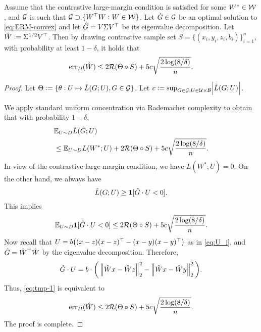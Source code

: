 \begin{theorem}\label{thm:main}
Assume that the contrastive large-margin condition is satisfied for some $W^* \in \mathcal{W}$, and $\mathcal{G}$ is such that $\mathcal{G} \supset \{ W^{\top} W: W \in \mathcal{W}\}$. Let $\hat{G} \in \mathcal{G}$ be an optimal solution to \eqref{eq:ERM-convex} and let $\hat{G} = V \Sigma V^{\top}$ be its eigenvalue decomposition. Let $\hat{W} := \Sigma^{1/2} V^{\top}$. Then by drawing contrastive sample set $S = \{(x_i, y_i, z_i, b_i)\}_{i=1}^n$, with probability at least $1-\delta$, it holds that 
\begin{equation*}
\mathrm{err}_D(\hat{W}) \leq 2 \mathcal{R}(\Theta \circ S) + 5c \sqrt{\frac{2 \log(8/\delta)}{n}}.
\end{equation*}
\end{theorem}
\begin{proof}
Let $\Theta := \{\theta: U \mapsto \tilde{L}(G; U), G \in \mathcal{G}\}$. Let $c := \sup_{G \in \mathcal{G}, U \in \mathcal{U} \times \mathcal{B}} \abs{ \tilde{L}(G; U)}$.

We apply standard uniform concentration via Rademacher complexity \citep{bartlett2002rademacher} to obtain that with probability $1-\delta$,
\begin{align*}
&\mathbb{E}_{U \sim D} \tilde{L}(\hat{G}; U) \\
&\leq \mathbb{E}_{U \sim D} L(W^*; U) + 2 \mathcal{R}(\Theta \circ S) + 5c \sqrt{\frac{2 \log(8/\delta)}{n}}.
\end{align*}
In view of the contrastive large-margin condition, we have $L(W^*; U) = 0$. On the other hand, we always have
\begin{equation*}
\tilde{L}(G; U) \geq \mathbf{1}[\hat{G} \cdot U < 0].
\end{equation*}
This implies
\begin{equation}\label{eq:tmp-1}
\mathbb{E}_{U \sim D} \mathbf{1}[\hat{G} \cdot U < 0] \leq 2 \mathcal{R}(\Theta \circ S) + 5c \sqrt{\frac{2 \log(8/\delta)}{n}}.
\end{equation}
Now recall that $U = b \big( (x-z)(x-z)^{\top} - (x-y)(x-y)^{\top} \big)$ as in \eqref{eq:U_i}, and $\hat{G} = \hat{W}^{\top} \hat{W}$ by the eigenvalue decomposition. Therefore,
\begin{equation*}
\hat{G} \cdot U = b \cdot \bigg( \left\lVert \hat{W}x - \hat{W}z \right\rVert_{2}^2 - \left\lVert \hat{W}x - \hat{W}y \right\rVert_{2}^2 \bigg).
\end{equation*}
Thus, \eqref{eq:tmp-1} is equivalent to
\begin{equation}
\mathrm{err}_D(\hat{W}) \leq 2 \mathcal{R}(\Theta \circ S) + 5c \sqrt{\frac{2 \log(8/\delta)}{n}}.
\end{equation}
The proof is complete.
\end{proof}

